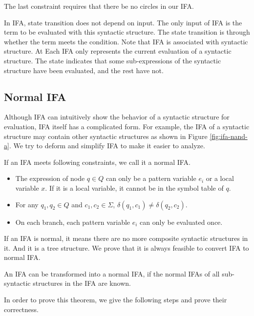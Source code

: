 The last constraint requires that there be no circles in our IFA.

In IFA, state transition does not depend on input. The only input of IFA is the term to be evaluated with this syntactic structure. The state transition is through whether the term meets the condition. Note that IFA is associated with syntactic structure. At Each IFA only represents the current evaluation of a syntactic structure. The state indicates that some sub-expressions of the syntactic structure have been evaluated, and the rest have not.

\subsection{Normal IFA}

Although IFA can intuitively show the behavior of a syntactic structure for evaluation, IFA itself has a complicated form. For example, the IFA of a syntactic structure may contain other syntactic structures as shown in Figure \ref{fig:ifa-nand-a}. We try to deform and simplify IFA to make it easier to analyze.

\begin{Def}
    \label{def:nmlifa}
    If an IFA meets following constraints, we call it a normal IFA.
    \begin{itemize}
        \item The expression of node $q \in Q$ can only be a pattern variable $e_i$ or a local variable $x$. If it is a local variable, it cannot be in the symbol table of $q$.
        \item For any $q_1,q_2 \in Q$ and $c_1, c_2 \in \Sigma$, $\delta(q_1, c_1) \neq \delta(q_2, c_2)$.
        \item On each branch, each pattern variable $e_i$ can only be evaluated once.
    \end{itemize}
\end{Def}

If an IFA is normal, it means there are no more composite syntactic structures in it. And it is a tree structure. We  prove that it is always feasible to convert IFA to normal IFA.

\begin{mythm}
    \label{mythm:nmlifa}
    An IFA can be transformed into a normal IFA, if the normal IFAs of all sub-syntactic structures in the IFA are known.
\end{mythm}

In order to prove this theorem, we give the following steps and prove their correctness.

